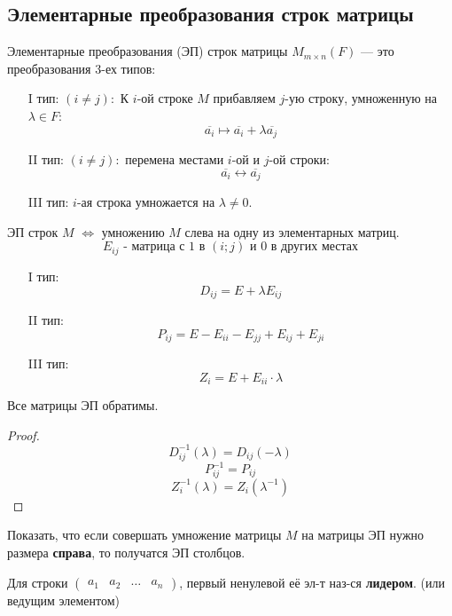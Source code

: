 \subsection{Элементарные преобразования строк матрицы}
\begin{definition}
Элементарные преобразования (ЭП) строк матрицы $M_{m\times n}(F)$ --- это преобразования 3-ех типов:
\begin{itemize}
  \item [I тип:] $(i \neq j) \colon $ К $i$-ой строке $M$ прибавляем $j$-ую строку, умноженную на $\lambda \in F$:
    \[
    \overline{a_i} \mapsto \overline{a_i} + \lambda \overline{a_j}
    \]
  \item [II тип: ] $(i \neq j)\colon $ перемена местами $i$-ой и $j$-ой строки:
    \[
    \overline{a_i} \leftrightarrow \overline{a_j}
    \]
  \item [III тип: ] $i$-ая строка умножается на $\lambda \neq 0$.
\end{itemize}
\end{definition}
\begin{statement}
ЭП строк $M$ $\iff$ умножению $M$ слева на одну из элементарных матриц.
  \[
  E_{ij} \text{ - матрица с 1 в $(i; j)$ и 0 в других местах}
  \]
\begin{itemize}
  \item [I тип:] \[
      D_{ij} = E + \lambda E_{ij}
  \]
\item [II тип:]
      \[
      P_{ij} = E - E_{ii} - E_{jj} + E_{ij} + E_{ji}
      \]
  \item [III тип:]
    \[
      Z_i = E + E_{ii} \cdot \lambda
    \]
\end{itemize}
\end{statement}
\begin{statement}
Все матрицы ЭП обратимы.
\end{statement}
\begin{proof}
\[
D_{ij}^{-1}(\lambda) = D_{ij}(-\lambda)
\]
\[
P^{-1}_{ij} = P_{ij}
\]
\[
Z_i^{-1}(\lambda) = Z_i(\lambda^{-1})
\]
\end{proof}
\begin{task}
Показать, что если совершать умножение матрицы $M$ на матрицы ЭП нужно размера \textbf{справа}, то получатся ЭП столбцов.
\end{task}
\begin{definition}
  Для строки $\begin{pmatrix} a_1 & a_2 & \ldots & a_n \end{pmatrix}$, первый ненулевой её эл-т наз-ся \textbf{лидером}. (или ведущим элементом)
\end{definition}
